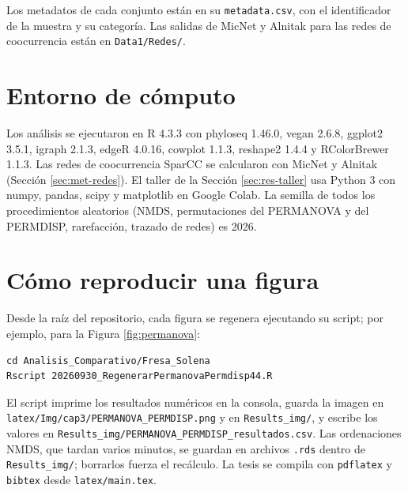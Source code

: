 Los metadatos de cada conjunto están en su \texttt{metadata.csv}, con el identificador de la
muestra y su categoría. Las salidas de MicNet y Alnitak para las redes de coocurrencia están en
\texttt{Data1/Redes/}.

\section*{Entorno de cómputo}

Los análisis se ejecutaron en R 4.3.3 con phyloseq 1.46.0, vegan 2.6.8, ggplot2 3.5.1,
igraph 2.1.3, edgeR 4.0.16, cowplot 1.1.3, reshape2 1.4.4 y RColorBrewer 1.1.3. Las redes de
coocurrencia SparCC se calcularon con MicNet y Alnitak (Sección \ref{sec:met-redes}). El taller de la
Sección \ref{sec:res-taller} usa Python 3 con numpy, pandas, scipy y matplotlib en Google Colab.
La semilla de todos los procedimientos aleatorios (NMDS, permutaciones del PERMANOVA y del
PERMDISP, rarefacción, trazado de redes) es 2026.

\section*{Cómo reproducir una figura}

Desde la raíz del repositorio, cada figura se regenera ejecutando su script; por ejemplo, para la
Figura \ref{fig:permanova}:

\begin{lstlisting}[basicstyle=\small\ttfamily]
cd Analisis_Comparativo/Fresa_Solena
Rscript 20260930_RegenerarPermanovaPermdisp44.R
\end{lstlisting}

El script imprime los resultados numéricos en la consola, guarda la imagen en
\texttt{latex/Img/cap3/PERMANOVA\_PERMDISP.png} y en \texttt{Results\_img/}, y escribe los valores
en \texttt{Results\_img/PERMANOVA\_PERMDISP\_resultados.csv}. Las ordenaciones NMDS, que tardan
varios minutos, se guardan en archivos \texttt{.rds} dentro de \texttt{Results\_img/}; borrarlos
fuerza el recálculo. La tesis se compila con \texttt{pdflatex} y \texttt{bibtex} desde
\texttt{latex/main.tex}.
